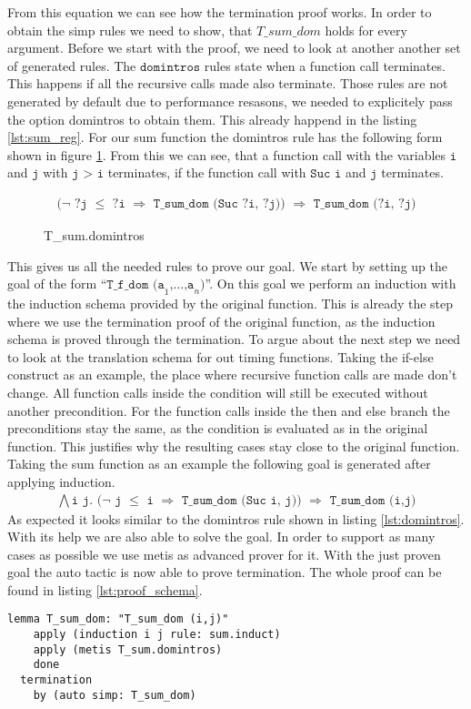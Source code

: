 From this equation we can see how the termination proof works.
In order to obtain the simp rules we need to show, that $T\_sum\_dom$ holds for every argument.
Before we start with the proof, we need to look at another another set of generated rules.
The $\texttt{domintros}$ rules state when a function call terminates.
This happens if all the recursive calls made also terminate.
Those rules are not generated by default due to performance resasons, we needed to explicitely pass the option domintros to obtain them.
This already happend in the listing \ref{lst:sum_reg}.
For our sum function the domintros rule has the following form shown in figure \ref{fig:domintros}.
From this we can see, that a function call with the variables $\texttt{i}$ and $\texttt{j}$ with $\texttt{j > i}$ terminates,
if the function call with $\texttt{Suc i}$ and $\texttt{j}$ terminates.
\begin{figure}[H]
\begin{align*}
  \texttt{($\lnot$ ?j $\le$ ?i $\Longrightarrow$ T\_sum\_dom (Suc ?i, ?j)) $\Longrightarrow$ T\_sum\_dom (?i, ?j)}
\end{align*}
\caption{T\_sum.domintros}
\label{fig:domintros}
\end{figure}

This gives us all the needed rules to prove our goal.
We start by setting up the goal of the form ``$\texttt{T\_f\_dom (a}_{1}\texttt{,}\dots\texttt{,a}_{n}\texttt{)}$''.
On this goal we perform an induction with the induction schema provided by the original function.
This is already the step where we use the termination proof of the original function,
as the induction schema is proved through the termination.
To argue about the next step we need to look at the translation schema for out timing functions.
Taking the if-else construct as an example, the place where recursive function calls are made don't change.
All function calls inside the condition will still be executed without another precondition.
For the function calls inside the then and else branch the preconditions stay the same, as the condition is evaluated as in the original function.
This justifies why the resulting cases stay close to the original function.
Taking the sum function as an example the following goal is generated after applying induction.
\begin{align*}
  \texttt{$\bigwedge$i j. ($\lnot$ j $\le$ i $\Longrightarrow$ T\_sum\_dom (Suc i, j)) $\Longrightarrow$ T\_sum\_dom (i,j)}
\end{align*}
As expected it looks similar to the domintros rule shown in listing \ref{lst:domintros}.
With its help we are also able to solve the goal.
In order to support as many cases as possible we use metis as advanced prover for it.
With the just proven goal the auto tactic is now able to prove termination.
The whole proof can be found in listing \ref{lst:proof_schema}.
\begin{lstlisting}[language=isabelle,mathescape=true,label=lst:proof_schema,caption=Proof schema over dom with help of original function]
  lemma T_sum_dom: "T_sum_dom (i,j)"
    apply (induction i j rule: sum.induct)
    apply (metis T_sum.domintros)
    done
  termination
    by (auto simp: T_sum_dom)
\end{lstlisting}

